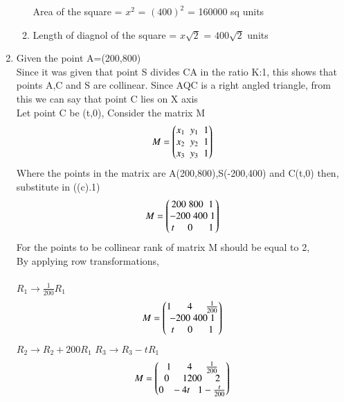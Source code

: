 \documentclass[journal]{IEEEtran}
\begin{document}
\begin{enumerate}[label=(\alph*)]
\begin{enumerate}[label=(\roman*)]
                Area of the square = $x^2$ = $(400)^2$ = 160000 sq units\\
                \item Length of diagnol of the square = $x\sqrt{2}$ = $400\sqrt{2}$ units\\
            \end{enumerate}
            \item Given the point A=(200,800)\\
            Since it was given that point S divides CA in the ratio K:1, this shows that points A,C and S are collinear. Since AQC is a right angled triangle, from this we can say that point C lies on X axis\\
            Let point C be (t,0), Consider the matrix M\\
            \begin{align}
                M = \begin{pmatrix}x_1\;\;y_1\;\;1\\x_2\;\;y_2\;\;1\\x_3\;\;y_3\;\;1\end{pmatrix}
            \end{align}
            Where the points in the matrix are A(200,800),S(-200,400) and C(t,0) then,\\ substitute in ((c).1)
            \begin{align}
                M = \begin{pmatrix}200\;800\;\;1\\-200\;400\;1\\t\;\;\;\;\;0\;\;\;\;\;\;1\end{pmatrix}
            \end{align}
            For the points to be collinear rank of matrix M should be equal to 2,\\
            By applying row transformations,\\\\
            {\large$R_1\rightarrow{}\frac{1}{200}R_1$}
            \begin{align}
                 M = \begin{pmatrix}1\;\;\;\;\;\;4\;\;\;\;\;\frac{1}{200}\\-200\;400\;1\\t\;\;\;\;\;0\;\;\;\;\;\;1\end{pmatrix}
            \end{align}
            {\large$R_2\rightarrow{}R_2 + 200R_1$}\hspace{2cm}
            {\large$R_3\rightarrow{R_3 - tR_1}$}
            \begin{align}
                 M = \myvec{1\;\;\;\;\;\;4\;\;\;\;\;\frac{1}{200}\\0\;\;\;\;\;1200\;\;\;\;\;2\\0\;\;\;-4t\;\;\;1-\frac{t}{200}}

\end{align}
\end{enumerate}
\end{document}
